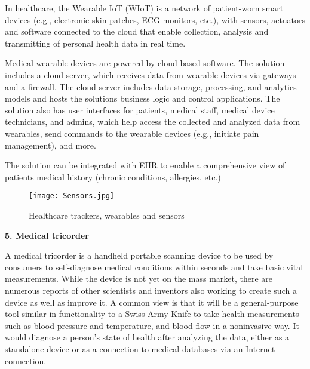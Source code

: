 \documentclass[12pt,a4paper]{article}
\begin{document}
\hspace{1cm}



In healthcare, the Wearable IoT (WIoT) is a network of patient-worn smart devices (e.g., electronic skin patches, ECG monitors, etc.), with sensors, actuators and software connected to the cloud that enable collection, analysis and transmitting of personal health data in real time.


Medical wearable devices are powered by cloud-based software. The solution includes a cloud server, which receives data from wearable devices via gateways and a firewall. The cloud server includes data storage, processing, and analytics models and hosts the solutions business logic and control applications. The solution also has user interfaces for patients, medical staff, medical device technicians, and admins, which help access the collected and analyzed data from wearables, send commands to the wearable devices (e.g., initiate pain management), and more.

The solution can be integrated with EHR to enable a comprehensive view of patients medical history (chronic conditions, allergies, etc.)



\hspace{2cm}

\begin{figure}[h]
\centering
\texttt{[image: Sensors.jpg]}
\caption{Healthcare trackers, wearables and sensors}
\end{figure}




\clearpage



\textbf{5. Medical tricorder}

\hspace{1cm}


A medical tricorder is a handheld portable scanning device to be used by consumers to self-diagnose medical conditions within seconds and take basic vital measurements. While the device is not yet on the mass market, there are numerous reports of other scientists and inventors also working to create such a device as well as improve it. A common view is that it will be a general-purpose tool similar in functionality to a Swiss Army Knife to take health measurements such as blood pressure and temperature, and blood flow in a noninvasive way. It would diagnose a person's state of health after analyzing the data, either as a standalone device or as a connection to medical databases via an Internet connection.
\end{document}
